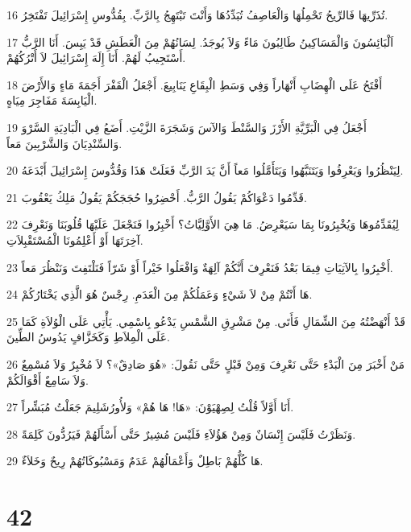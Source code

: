 \par 16 تُذَرِّيهَا فَالرِّيحُ تَحْمِلُهَا وَالْعَاصِفُ تُبَدِّدُهَا وَأَنْتَ تَبْتَهِجُ بِالرَّبِّ. بِقُدُّوسِ إِسْرَائِيلَ تَفْتَخِرُ.
\par 17 اَلْبَائِسُونَ وَالْمَسَاكِينُ طَالِبُونَ مَاءً وَلاَ يُوجَدُ. لِسَانُهُمْ مِنَ الْعَطَشِ قَدْ يَبِسَ. أَنَا الرَّبُّ أَسْتَجِيبُ لَهُمْ. أَنَا إِلَهَ إِسْرَائِيلَ لاَ أَتْرُكُهُمْ.
\par 18 أَفْتَحُ عَلَى الْهِضَابِ أَنْهَاراً وَفِي وَسَطِ الْبِقَاعِ يَنَابِيعَ. أَجْعَلُ الْقَفْرَ أَجَمَةَ مَاءٍ وَالأَرْضَ الْيَابِسَةَ مَفَاجِرَ مِيَاهٍ.
\par 19 أَجْعَلُ فِي الْبَرِّيَّةِ الأَرْزَ وَالسَّنْطَ وَالآسَ وَشَجَرَةَ الزَّيْتِ. أَضَعُ فِي الْبَادِيَةِ السَّرْوَ وَالسِّنْدِيَانَ وَالشَّرْبِينَ مَعاً.
\par 20 لِيَنْظُرُوا وَيَعْرِفُوا وَيَتَنَبَّهُوا وَيَتَأَمَّلُوا مَعاً أَنَّ يَدَ الرَّبِّ فَعَلَتْ هَذَا وَقُدُّوسَ إِسْرَائِيلَ أَبْدَعَهُ.
\par 21 قَدِّمُوا دَعْوَاكُمْ يَقُولُ الرَّبُّ. أَحْضِرُوا حُجَجَكُمْ يَقُولُ مَلِكُ يَعْقُوبَ.
\par 22 لِيُقَدِّمُوهَا وَيُخْبِرُونَا بِمَا سَيَعْرِضُ. مَا هِيَ الأَوَّلِيَّاتُ؟ أَخْبِرُوا فَنَجْعَلَ عَلَيْهَا قُلُوبَنَا وَنَعْرِفَ آخِرَتَهَا أَوْ أَعْلِمُونَا الْمُسْتَقْبِلاَتِ.
\par 23 أَخْبِرُوا بِالآتِيَاتِ فِيمَا بَعْدُ فَنَعْرِفَ أَنَّكُمْ آلِهَةٌ وَافْعَلُوا خَيْراً أَوْ شَرّاً فَنَلْتَفِتَ وَنَنْظُرَ مَعاً.
\par 24 هَا أَنْتُمْ مِنْ لاَ شَيْءٍ وَعَمَلُكُمْ مِنَ الْعَدَمِ. رِجْسٌ هُوَ الَّذِي يَخْتَارُكُمْ.
\par 25 قَدْ أَنْهَضْتُهُ مِنَ الشِّمَالِ فَأَتَى. مِنْ مَشْرِقِ الشَّمْسِ يَدْعُو بِاسْمِي. يَأْتِي عَلَى الْوُلاَةِ كَمَا عَلَى الْمِلاَطِ وَكَخَزَّافٍ يَدُوسُ الطِّينَ.
\par 26 مَنْ أَخْبَرَ مِنَ الْبَدْءِ حَتَّى نَعْرِفَ وَمِنْ قَبْلٍ حَتَّى نَقُولَ: «هُوَ صَادِقٌ»؟ لاَ مُخْبِرٌ وَلاَ مُسْمِعٌ وَلاَ سَامِعٌ أَقْوَالَكُمْ.
\par 27 أَنَا أَوَّلاً قُلْتُ لِصِهْيَوْنَ: «هَا! هَا هُمْ» وَلأُورُشَلِيمَ جَعَلْتُ مُبَشِّراً.
\par 28 وَنَظَرْتُ فَلَيْسَ إِنْسَانٌ وَمِنْ هَؤُلاَءِ فَلَيْسَ مُشِيرٌ حَتَّى أَسْأَلَهُمْ فَيَرُدُّونَ كَلِمَةً.
\par 29 هَا كُلُّهُمْ بَاطِلٌ وَأَعْمَالُهُمْ عَدَمٌ وَمَسْبُوكَاتُهُمْ رِيحٌ وَخَلاَءٌ.

\chapter{42}

